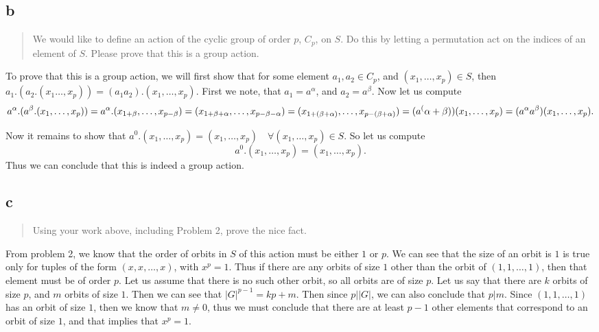 \hypertarget{b-1}{%
\subsection{b}\label{b-1}}

\begin{quote}
We would like to define an action of the cyclic group of order \(p\),
\(C_p\), on \(S\). Do this by letting a permutation act on the indices
of an element of \(S\). Please prove that this is a group action.
\end{quote}

To prove that this is a group action, we will first show that for some
element \(a_1,a_2\in C_p\), and \((x_1,\ldots,x_p)\in S\), then
\(a_1.(a_2.(x_1\ldots,x_p))=(a_1a_2).(x_1,\ldots,x_p)\). First we note,
that \(a_1=a^\alpha\), and \(a_2=a^\beta\). Now let us compute \[
a^\alpha.(a^\beta.(x_1,\ldots,x_p))=a^\alpha.(x_{1+\beta},\ldots,x_{p-\beta})\\
=(x_{1+\beta+\alpha},\ldots,x_{p-\beta-\alpha})\\
=(x_{1+(\beta+\alpha)},\ldots,x_{p-(\beta+\alpha)})\\
=(a^(\alpha+\beta))(x_1,\ldots,x_p)\\
=(a^\alpha a^\beta)(x_1,\ldots,x_p).
\]

Now it remains to show that
\(a^0.(x_1,\ldots,x_p)=(x_1,\ldots,x_p)\quad\forall (x_1,\ldots,x_p)\in S\).
So let us compute \[
a^0.(x_1,\ldots,x_p)=(x_1,\ldots,x_p).
\] Thus we can conclude that this is indeed a group action.

\hypertarget{c-1}{%
\subsection{c}\label{c-1}}

\begin{quote}
Using your work above, including Problem 2, prove the nice fact.
\end{quote}

From problem 2, we know that the order of orbits in \(S\) of this action
must be either \(1\) or \(p\). We can see that the size of an orbit is
\(1\) is true only for tuples of the form \((x,x,\ldots,x)\), with
\(x^p=1\). Thus if there are any orbits of size \(1\) other than the
orbit of \((1,1,\ldots,1)\), then that element must be of order \(p\).
Let us assume that there is no such other orbit, so all orbits are of
size \(p\). Let us say that there are \(k\) orbits of size \(p\), and
\(m\) orbits of size \(1\). Then we can see that \(|G|^{p-1}=kp+m\).
Then since \(p\big\vert|G|\), we can also conclude that \(p|m\). Since
\((1,1,\ldots,1)\) has an orbit of size \(1\), then we know that
\(m\neq 0\), thus we must conclude that there are at least \(p-1\) other
elements that correspond to an orbit of size \(1\), and that implies
that \(x^p=1\).

